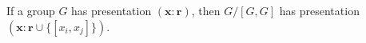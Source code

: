 If a group $G$ has presentation $(\mathbf{x} : \mathbf{r})$, then $G/[G,G]$ has presentation $(\mathbf{x} : \mathbf{r} \cup \{[x_i, x_j]\})$.

